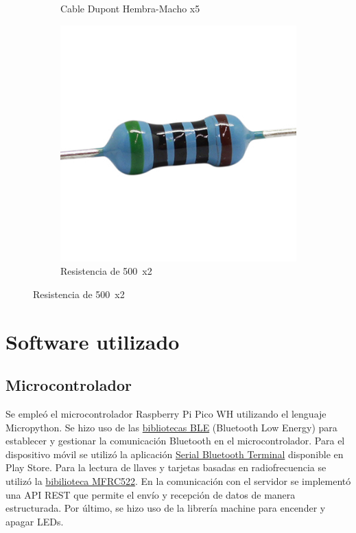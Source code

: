 \documentclass{article}
\begin{document}
\begin{figure}[!ht]
\begin{subfigure}[b]{0.3\textwidth}
		\caption*{Cable Dupont Hembra-Macho x5}
		\label{fig:cable mh}
	\end{subfigure}
	\hfill
	\begin{subfigure}[b]{0.3\textwidth}
		\includegraphics[width=\textwidth]{../images/resistencia.jpg}
		\caption*{Resistencia de 500\textOmega\ x2}
		\label{fig:resistencia}
	\end{subfigure}
\end{figure}


\section{Software utilizado}
\subsection{Microcontrolador}
Se empleó el microcontrolador Raspberry Pi Pico WH utilizando el lenguaje Micropython. Se hizo uso de las \href{https://github.com/micropython/micropython/tree/master/examples/bluetooth}{bibliotecas BLE} (Bluetooth Low Energy) para establecer y gestionar la comunicación Bluetooth en el microcontrolador. Para el dispositivo móvil se utilizó la aplicación \href{https://play.google.com/store/apps/details?id=de.kai_morich.serial_usb_terminal&pcampaignid=web_share}{Serial Bluetooth Terminal} disponible en Play Store. Para la lectura de llaves y tarjetas basadas en radiofrecuencia se utilizó la \href{https://github.com/danjperron/micropython-mfrc522/blob/master/mfrc522.py}{bibilioteca MFRC522}. En la comunicación con el servidor se implementó una API REST que permite el envío y recepción de datos de manera estructurada. Por último, se hizo uso de la librería machine para encender y apagar LEDs.
\end{document}
